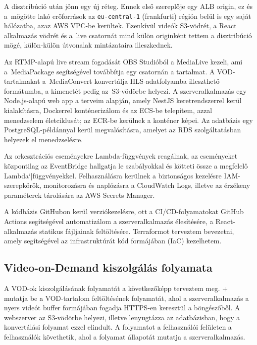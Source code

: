 A disztribúció után jönn egy új réteg. Ennek első szereplője egy ALB origin, ez és a~mögötte lakó erőforrások az \verb|eu-central-1| (frankfurti) régión belül is egy saját hálózatba, azaz AWS VPC-be kerültek. Ezenkívül videók S3-vödrét, a React alkalmazás vödrét és a~live csatornát mind külön originként tettem a disztribúció mögé, külön-külön útvonalak mintázataira illeszkednek.

Az RTMP-alapú live stream fogadását OBS Studióból a MediaLive kezeli, ami a~MediaPackage segítségével továbbítja egy csatornán a tartalmat. A VOD-tartalmakat a~MediaConvert konvertálja HLS-adatfolyamba illeszthető formátumba, a kimenetét pedig az~S3\leavevmode\hbox{-}vödörbe helyezi. A szerveralkalmazás egy Node.js-alapú web app a terveim alapján, amely NestJS keretrendszerrel kerül kialakításra, Dockerrel konténerizálom és az ECS-be telepítem, azzal menedzselem életciklusát; az ECR-be kerülnek a konténer képei. Az adatbázis egy PostgreSQL-példánnyal kerül megvalósításra, amelyet az RDS szolgáltatásban helyezek el menedzselésre.

Az orkesztrációs eseményekre Lambda-függvények reagálnak, az eseményeket központilag az EventBridge hallgatja le szabályokkal és kötteti össze a megfelelő Lambda`|függvényekkel. Felhasználásra kerülnek a biztonságos kezelésre IAM-szerepkörök, monitorozásra és naplózásra a CloudWatch Logs, illetve az érzékeny paraméterek tárolására az AWS Secrets Manager.

A kódbázis GitHubon kerül verziókezelésre, ott a CI/CD-folyamatokat GitHub Actions segítségével automatizálom a szerveralkalmazás élesítésére, a React-alkalmazás statikus fájljainak feltöltésére. Terraformot terveztem bevezetni, amely segítségével az infrastruktúrát kód formájában (IaC) kezelhetem.\cite{iac}

\subsection{Video-on-Demand kiszolgálás folyamata}

A VOD-ok kiszolgálásának folyamatát a következőképp terveztem meg. \Az+ mutatja be a VOD-tartalom feltöltésének folyamatát, ahol a szerveralkalmazás a nyers videót buffer formájában fogadja HTTPS-en keresztül a böngészőből. A webszerver az S3-vödörbe helyezi, illetve lenyugtázza az adatbázisban, hogy a konvertálási folyamat ezzel elindult. A folyamatot a felhasználói felületen a felhasználók követhetik, ahol a folyamat állapotát mutatja a szerveralkalmazás.

